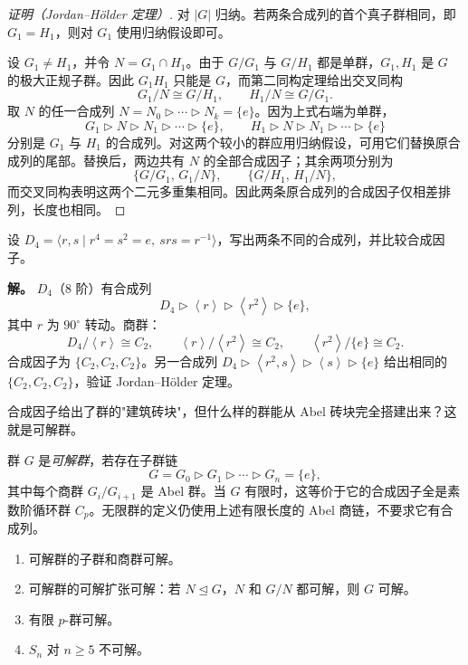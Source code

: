 \par\medskip
\begin{proof}[证明（Jordan--H\"older 定理）]
对 $|G|$ 归纳。若两条合成列的首个真子群相同，即 $G_1=H_1$，则对 $G_1$ 使用归纳假设即可。

设 $G_1\ne H_1$，并令 $N=G_1\cap H_1$。由于 $G/G_1$ 与 $G/H_1$ 都是单群，$G_1,H_1$ 是 $G$ 的极大正规子群。因此 $G_1H_1$ 只能是 $G$，而第二同构定理给出交叉同构
\[
G_1/N\cong G/H_1,
\qquad
H_1/N\cong G/G_1.
\]
取 $N$ 的任一合成列 $N=N_0\rhd\cdots\rhd N_k=\{e\}$。因为上式右端为单群，
\[
G_1\rhd N\rhd N_1\rhd\cdots\rhd\{e\},
\qquad
H_1\rhd N\rhd N_1\rhd\cdots\rhd\{e\}
\]
分别是 $G_1$ 与 $H_1$ 的合成列。对这两个较小的群应用归纳假设，可用它们替换原合成列的尾部。替换后，两边共有 $N$ 的全部合成因子；其余两项分别为
\[
\{G/G_1,\,G_1/N\},
\qquad
\{G/H_1,\,H_1/N\},
\]
而交叉同构表明这两个二元多重集相同。因此两条原合成列的合成因子仅相差排列，长度也相同。
\end{proof}\par\medskip

\begin{example}[{$D_4$ 的合成列与合成因子}]
设 $D_4=\langle r,s\mid r^4=s^2=e,\ srs=r^{-1}\rangle$，写出两条不同的合成列，并比较合成因子。

\textbf{解。} $D_4$（8 阶）有合成列
\[
D_4\rhd\left\langle r\right\rangle\rhd\left\langle r^2\right\rangle\rhd\{e\},
\]
其中 $r$ 为 $90^\circ$ 转动。商群：
\[
D_4/\left\langle r\right\rangle\cong C_2,
\qquad
\left\langle r\right\rangle/\left\langle r^2\right\rangle\cong C_2,
\qquad
\left\langle r^2\right\rangle/\{e\}\cong C_2.
\]
合成因子为 $\{C_2,C_2,C_2\}$。另一合成列 $D_4\rhd\left\langle r^2,s\right\rangle\rhd\left\langle s\right\rangle\rhd\{e\}$ 给出相同的 $\{C_2,C_2,C_2\}$，验证 Jordan--H\"older 定理。
\end{example}

合成因子给出了群的"建筑砖块"，但什么样的群能从 Abel 砖块完全搭建出来？这就是可解群。

\begin{definition}[可解群]
群 $G$ 是\emph{可解群}，若存在子群链
\[
G=G_0\rhd G_1\rhd\cdots\rhd G_n=\{e\},
\]
其中每个商群 $G_i/G_{i+1}$ 是 Abel 群。当 $G$ 有限时，这等价于它的合成因子全是素数阶循环群 $C_p$。无限群的定义仍使用上述有限长度的 Abel 商链，不要求它有合成列。
\end{definition}

\begin{proposition}[可解群的基本性质]
\begin{enumerate}[label=(\roman*),leftmargin=3em]
\item 可解群的子群和商群可解。
\item 可解群的可解扩张可解：若 $N\mathrel{\trianglelefteq} G$，$N$ 和 $G/N$ 都可解，则 $G$ 可解。
\item 有限 $p$-群可解。
\item $S_n$ 对 $n\ge5$ 不可解。
\end{enumerate}
\end{proposition}

